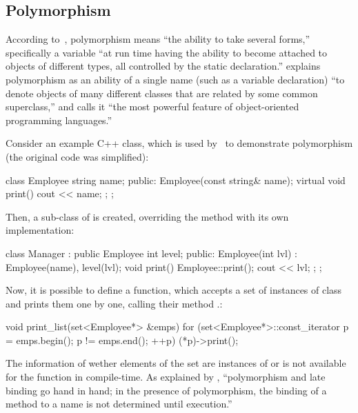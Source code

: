 \subsection{Polymorphism}

According to~\citet[p.467]{meyer1997object}, polymorphism means
``the ability to take several forms,'' specifically a variable
``at run time having the ability to become attached to objects
of different types, all controlled by the static declaration.''
\citet[p.67]{grady2007object} explains polymorphism as
an ability of a single name (such as a variable declaration)
``to denote objects of many different classes that are related by some common superclass,''
and calls it ``the most powerful feature of object-oriented programming languages.''

Consider an example C++ class, which is used by~\citet[p.310]{stroustrup1997}
to demonstrate polymorphism (the original code was simplified):

\begin{ffcode}
class Employee {
  string name;
public:
  Employee(const string& name);
  virtual void print() { cout << name; };
};
\end{ffcode}

Then, a sub-class of  is created, overriding
the method  with its own implementation:

\begin{ffcode}
class Manager : public Employee {
  int level;
public:
  Employee(int lvl) :
    Employee(name), level(lvl);
  void print() {
    Employee::print();
    cout << lvl;
  };
};
\end{ffcode}

Now, it is possible to define a function, which accepts a set
of instances of class  and prints them one by one,
calling their method .:

\begin{ffcode}
void print_list(set<Employee*> &emps) {
  for (set<Employee*>::const_iterator p =
    emps.begin(); p != emps.end(); ++p) {
    (*p)->print();
  }
}
\end{ffcode}

The information of wether elements of the set  are instances of 
or  is not available for the  function in compile-time.
As explained by \citet[p.103]{grady2007object},
``polymorphism and late binding go hand in hand;
in the presence of polymorphism, the binding of a method
to a name is not determined until execution.''

